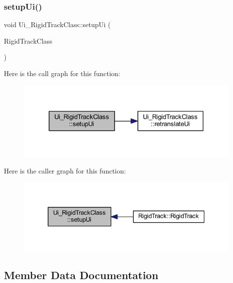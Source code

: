 \subsubsection{\texorpdfstring{setup\+Ui()}{setupUi()}}
{\footnotesize\ttfamily void Ui\+\_\+\+Rigid\+Track\+Class\+::setup\+Ui (\begin{DoxyParamCaption}\item[{Q\+Main\+Window $\ast$}]{Rigid\+Track\+Class }\end{DoxyParamCaption})\hspace{0.3cm}{\ttfamily [inline]}}

Here is the call graph for this function\+:
\nopagebreak
\begin{figure}[H]
\begin{center}
\leavevmode
\includegraphics[width=318pt]{class_ui___rigid_track_class_a7f78fefc15716049b873bef4d3450e38_cgraph}
\end{center}
\end{figure}
Here is the caller graph for this function\+:
\nopagebreak
\begin{figure}[H]
\begin{center}
\leavevmode
\includegraphics[width=331pt]{class_ui___rigid_track_class_a7f78fefc15716049b873bef4d3450e38_icgraph}
\end{center}
\end{figure}


\subsection{Member Data Documentation}
\mbox{\label{class_ui___rigid_track_class_adbf50ad17608dbfe8a688dc8f18d1ec3}} 
